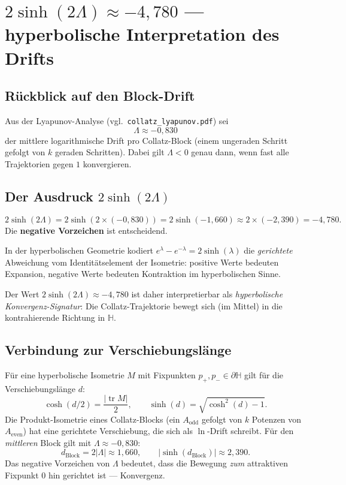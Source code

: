 \documentclass[12pt,a4paper]{article}
\newcommand{\sinh}{\operatorname{sinh}}
\renewcommand{\cosh}{\operatorname{cosh}}
\newcommand{\tr}{\operatorname{tr}}
\begin{document}
\section{$2\sinh(2\Lambda)\approx -4{,}780$ — hyperbolische Interpretation des Drifts}

\subsection{Rückblick auf den Block-Drift}

Aus der Lyapunov-Analyse (vgl.\ \texttt{collatz\_lyapunov.pdf}) sei
\[
  \Lambda \approx -0{,}830
\]
der mittlere logarithmische Drift pro Collatz-Block (einem ungeraden Schritt gefolgt
von $k$ geraden Schritten). Dabei gilt $\Lambda < 0$ genau dann, wenn
fast alle Trajektorien gegen $1$ konvergieren.

\subsection{Der Ausdruck $2\sinh(2\Lambda)$}

\[
  2\sinh(2\Lambda) = 2\sinh(2 \times (-0{,}830))
  = 2\sinh(-1{,}660)
  \approx 2 \times (-2{,}390) = -4{,}780.
\]
Die \textbf{negative Vorzeichen} ist entscheidend.

\begin{tcolorbox}[hyper]
In der hyperbolischen Geometrie kodiert $e^\lambda - e^{-\lambda} = 2\sinh(\lambda)$
die \emph{gerichtete} Abweichung vom Identitätselement der Isometrie:
positive Werte bedeuten Expansion, negative Werte bedeuten Kontraktion
im hyperbolischen Sinne.

Der Wert $2\sinh(2\Lambda) \approx -4{,}780$ ist daher interpretierbar als
\emph{hyperbolische Konvergenz-Signatur}: Die Collatz-Trajektorie bewegt sich
(im Mittel) in die kontrahierende Richtung in $\mathbb{H}$.
\end{tcolorbox}

\subsection{Verbindung zur Verschiebungslänge}

Für eine hyperbolische Isometrie $M$ mit Fixpunkten $p_+, p_- \in \partial\mathbb{H}$
gilt für die Verschiebungslänge $d$:
\[
  \cosh(d/2) = \frac{|\tr M|}{2}, \qquad
  \sinh(d) = \sqrt{\cosh^2(d) - 1}.
\]
Die Produkt-Isometrie eines Collatz-Blocks
(ein $A_{\text{odd}}$ gefolgt von $k$ Potenzen von $A_{\text{even}}$)
hat eine gerichtete Verschiebung, die sich als $\ln$-Drift schreibt.
Für den \emph{mittleren} Block gilt mit $\Lambda \approx -0{,}830$:
\[
  d_{\text{Block}} = 2|\Lambda| \approx 1{,}660,
  \qquad
  |\sinh(d_{\text{Block}})| \approx 2{,}390.
\]
Das negative Vorzeichen von $\Lambda$ bedeutet, dass die Bewegung
\emph{zum} attraktiven Fixpunkt $0$ hin gerichtet ist — Konvergenz.
\end{document}
